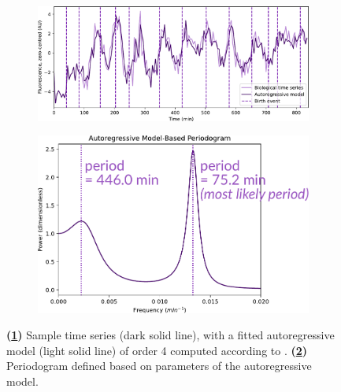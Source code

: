 \begin{figure}
  \centering
  \begin{subfigure}[htpb]{0.6\textwidth}
   \centering
   \includegraphics[width=\textwidth]{timeseries_example_for_ar}
   \caption{
   }
   \label{fig:analysis-ar-timeseries}
  \end{subfigure}%
  \begin{subfigure}[htpb]{0.4\textwidth}
   \centering
   \includegraphics[width=\textwidth]{ar}
   \caption{
   }
   \label{fig:analysis-ar-periodogram}
  \end{subfigure}

  \caption{
    \textbf{(\ref{fig:analysis-ar-timeseries})}
    Sample time series (dark solid line), with a fitted autoregressive model (light solid line) of order 4 computed according to \textcite{jiaFrequencyDomainAnalysis2020}.
    \textbf{(\ref{fig:analysis-ar-periodogram})}
    Periodogram defined based on parameters of the autoregressive model.
  }
  \label{fig:analysis-ar}
\end{figure}

